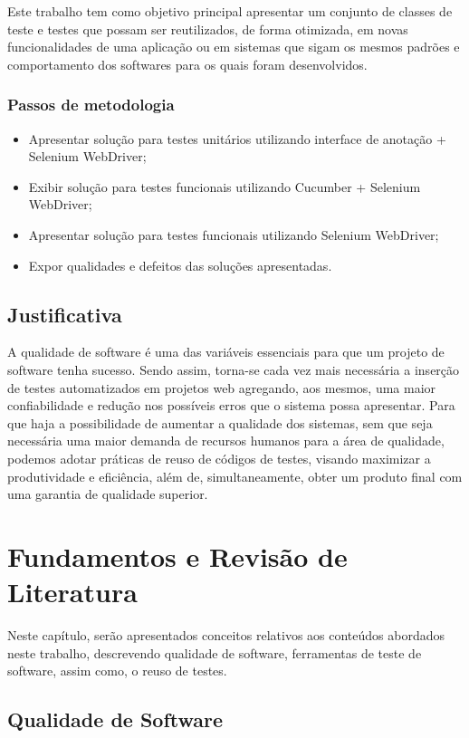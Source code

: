 \documentclass[tg]{mdtufsm}
\begin{document}
Este trabalho tem como objetivo principal apresentar um conjunto de classes de teste e testes que possam ser reutilizados, de forma otimizada, em novas funcionalidades de uma aplicação ou em sistemas que sigam os mesmos padrões e comportamento dos softwares para os quais foram desenvolvidos.

\subsection{Passos de metodologia}
\begin{itemize}
	\item Apresentar solução para testes unitários utilizando interface de anotação + Selenium WebDriver;
    \item Exibir solução para testes funcionais utilizando Cucumber + Selenium WebDriver;
    \item Apresentar solução para testes funcionais utilizando Selenium WebDriver;
    \item Expor qualidades e defeitos das soluções apresentadas.
\end{itemize}

\section{Justificativa}

A qualidade de software  é uma das variáveis essenciais para que um projeto de software tenha sucesso.
Sendo assim, torna-se cada vez mais necessária a inserção de testes automatizados em projetos web agregando, aos mesmos, uma maior confiabilidade e redução nos possíveis erros que o sistema possa
apresentar. Para que haja a possibilidade de aumentar a qualidade dos sistemas, sem que seja necessária uma maior
demanda de recursos humanos para a área de qualidade, podemos adotar práticas de reuso de códigos de testes, visando
maximizar a produtividade e eficiência, além de, simultaneamente, obter um produto final com uma garantia de qualidade
superior.

\chapter{Fundamentos e Revisão de Literatura}

Neste capítulo, serão apresentados conceitos relativos aos conteúdos abordados neste trabalho, descrevendo qualidade de software, ferramentas de teste de software, assim como, o reuso de testes.

\section{Qualidade de Software}
\end{document}
